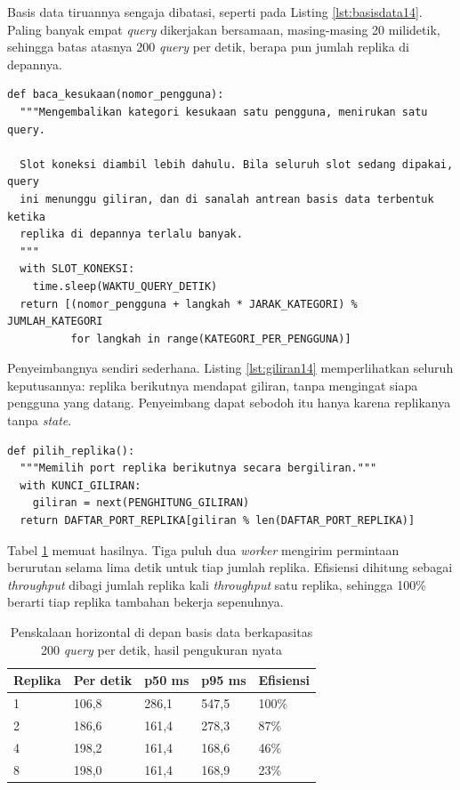 Basis data tiruannya sengaja dibatasi, seperti pada Listing
\ref{lst:basisdata14}. Paling banyak empat \textit{query} dikerjakan
bersamaan, masing-masing 20 milidetik, sehingga batas atasnya 200
\textit{query} per detik, berapa pun jumlah replika di depannya.

\begin{lstlisting}[style=PythonStyle, caption={Komponen bersama berkapasitas tetap, tersedia di \berkas{sources/chapter14/basis_data_tiruan.py}}, label={lst:basisdata14}]
def baca_kesukaan(nomor_pengguna):
  """Mengembalikan kategori kesukaan satu pengguna, menirukan satu query.

  Slot koneksi diambil lebih dahulu. Bila seluruh slot sedang dipakai, query
  ini menunggu giliran, dan di sanalah antrean basis data terbentuk ketika
  replika di depannya terlalu banyak.
  """
  with SLOT_KONEKSI:
    time.sleep(WAKTU_QUERY_DETIK)
  return [(nomor_pengguna + langkah * JARAK_KATEGORI) % JUMLAH_KATEGORI
          for langkah in range(KATEGORI_PER_PENGGUNA)]
\end{lstlisting}

Penyeimbangnya sendiri sederhana. Listing \ref{lst:giliran14} memperlihatkan
seluruh keputusannya: replika berikutnya mendapat giliran, tanpa mengingat
siapa pengguna yang datang. Penyeimbang dapat sebodoh itu hanya karena
replikanya tanpa \textit{state}.

\begin{lstlisting}[style=PythonStyle, caption={Pembagian bergiliran, tersedia di \berkas{sources/chapter14/penyeimbang.py}}, label={lst:giliran14}]
def pilih_replika():
  """Memilih port replika berikutnya secara bergiliran."""
  with KUNCI_GILIRAN:
    giliran = next(PENGHITUNG_GILIRAN)
  return DAFTAR_PORT_REPLIKA[giliran % len(DAFTAR_PORT_REPLIKA)]
\end{lstlisting}

Tabel \ref{tab:skala14} memuat hasilnya. Tiga puluh dua \textit{worker}
mengirim permintaan berurutan selama lima detik untuk tiap jumlah replika.
Efisiensi dihitung sebagai \textit{throughput} dibagi jumlah replika kali
\textit{throughput} satu replika, sehingga 100\% berarti tiap replika
tambahan bekerja sepenuhnya.

\begin{table}[!htb]
  \centering
  \caption{Penskalaan horizontal di depan basis data berkapasitas 200
           \textit{query} per detik, hasil pengukuran nyata}
  \label{tab:skala14}
  \begin{tabularx}{\textwidth}{Xllll}
    \hline
    \textbf{Replika} & \textbf{Per detik} & \textbf{p50 ms} & \textbf{p95 ms} & \textbf{Efisiensi} \\
    \hline
    1 & 106,8 & 286,1 & 547,5 & 100\% \\
    \hline
    2 & 186,6 & 161,4 & 278,3 & 87\% \\
    \hline
    4 & 198,2 & 161,4 & 168,6 & 46\% \\
    \hline
    8 & 198,0 & 161,4 & 168,9 & 23\% \\
    \hline
  \end{tabularx}
\end{table}

